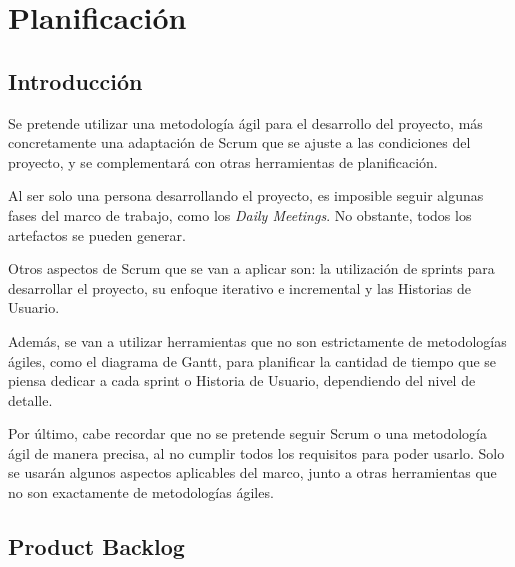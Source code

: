 \chapter{Planificación}

\section{Introducción}

Se pretende utilizar una metodología ágil para el desarrollo del proyecto, más concretamente una adaptación de Scrum que se ajuste a las condiciones del proyecto, y se complementará con otras herramientas de planificación.

\bigskip

Al ser solo una persona desarrollando el proyecto, es imposible seguir algunas fases del marco de trabajo, como los \textit{Daily Meetings}. No obstante, todos los artefactos se pueden generar.

\bigskip

Otros aspectos de Scrum que se van a aplicar son: la utilización de sprints para desarrollar el proyecto, su enfoque iterativo e incremental y las Historias de Usuario.

\bigskip

Además, se van a utilizar herramientas que no son estrictamente de metodologías ágiles, como el diagrama de Gantt, para planificar la cantidad de tiempo que se piensa dedicar a cada sprint o Historia de Usuario, dependiendo del nivel de detalle. 

\bigskip

Por último, cabe recordar que no se pretende seguir Scrum o una metodología ágil de manera precisa, al no cumplir todos los requisitos para poder usarlo. Solo se usarán algunos aspectos aplicables del marco, junto a otras herramientas que no son exactamente de metodologías ágiles.


\newpage

\section{Product Backlog}

